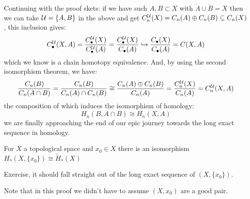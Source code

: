 \documentclass[a4paper]{article}
\begin{document}
Continuing with the proof skets: if we have such $A,B\subset X$ with $\mathring{A}\cup\mathring{B}=X$ then we can take $\mathcal{U}=\{A,B\}$ in the above and get $C_n^{\mathcal{U}}(X)=C_n(A)\oplus C_n(B) \subseteq C_n(X)$, this inclusion gives:\[
    C_\bullet^{\mathcal{U}}(X,A)=\frac{C_\bullet^{\mathcal{U}}(X)}{C_\bullet^{\mathcal{U}}(A)} = \frac{C_\bullet^{\mathcal{U}}(X)}{C_\bullet(A)} \hookrightarrow \frac{C_\bullet(X)}{C_\bullet(A)} = C(X,A)
\]
which we know is a chain homotopy equivalence. And, by using the second isomorphism theorem, we have: \[
    \frac{C_n(B)}{C_n(A\cap B)} = \frac{C_n(B)}{C_n(A)\cap C_n(B)} \cong \frac{C_n(A)\oplus C_n(B)}{C_n(A)} = \frac{C_n^{\mathcal{U}}(X)}{C_n(A)} = C_n^{\mathcal{U}}(X,A)
\]
the composition of which induces the isomorphism of homology:\[
    H_n(B,A\cap B) \cong H_n(X,A)
\]
we are finally approaching the end of our epic journey towards the long exact sequence in homology.
\begin{lem}
    For $X$ a topological space and $x_0\in X$ there is an isomorphism $H_*(X,\{x_0\})\cong\tilde{H}_*(X)$
    \begin{prf}
        Exercise, it should fall straight out of the long exact sequence of $(X,\{x_0\})$.
    \end{prf}
\end{lem}
Note that in this proof we didn't have to assume $(X,x_0)$ are a good pair.
\end{document}

